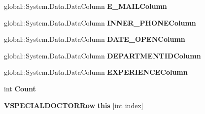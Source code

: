 \begin{CompactItemize}
\item 
global::System.Data.DataColumn \textbf{E\_\-MAILColumn}\hspace{0.3cm}{\tt  [get]}\label{class_automatic_medical_system_1_1_data_set1_1_1_v_s_p_e_c_i_a_l_d_o_c_t_o_r_data_table_7056e49120c5c098c00767d6762842de}

\item 
global::System.Data.DataColumn \textbf{INNER\_\-PHONEColumn}\hspace{0.3cm}{\tt  [get]}\label{class_automatic_medical_system_1_1_data_set1_1_1_v_s_p_e_c_i_a_l_d_o_c_t_o_r_data_table_c80a2c2bcf017d42320411316e94c787}

\item 
global::System.Data.DataColumn \textbf{DATE\_\-OPENColumn}\hspace{0.3cm}{\tt  [get]}\label{class_automatic_medical_system_1_1_data_set1_1_1_v_s_p_e_c_i_a_l_d_o_c_t_o_r_data_table_079fe42785c55735cc2e1f643cb3a556}

\item 
global::System.Data.DataColumn \textbf{DEPARTMENTIDColumn}\hspace{0.3cm}{\tt  [get]}\label{class_automatic_medical_system_1_1_data_set1_1_1_v_s_p_e_c_i_a_l_d_o_c_t_o_r_data_table_0a0f81ceb5a4e4425862ac73a2d5b088}

\item 
global::System.Data.DataColumn \textbf{EXPERIENCEColumn}\hspace{0.3cm}{\tt  [get]}\label{class_automatic_medical_system_1_1_data_set1_1_1_v_s_p_e_c_i_a_l_d_o_c_t_o_r_data_table_dce120f20e5c64592622f032f4f51f58}

\item 
int \textbf{Count}\hspace{0.3cm}{\tt  [get]}\label{class_automatic_medical_system_1_1_data_set1_1_1_v_s_p_e_c_i_a_l_d_o_c_t_o_r_data_table_3cfe24224b4f4414e2c40acf6e16cacc}

\item 
{\bf VSPECIALDOCTORRow} \textbf{this} [int index]\hspace{0.3cm}{\tt  [get]}\label{class_automatic_medical_system_1_1_data_set1_1_1_v_s_p_e_c_i_a_l_d_o_c_t_o_r_data_table_c6b9c94164d63143e65bce2b68a4689b}

\end{CompactItemize}
